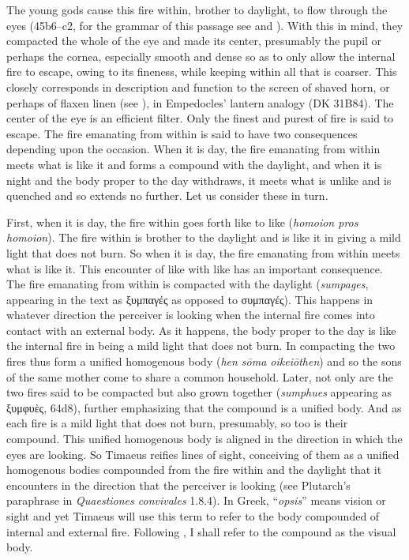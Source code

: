 The young gods cause this fire within, brother to daylight, to flow through the eyes (45b6--c2, for the grammar of this passage see \citealt[63 123--127]{Cook-Wilson:1889cs} and \citealt[277]{Taylor:1928qb}). With this in mind, they compacted the whole of the eye and made its center, presumably the pupil or perhaps the cornea, especially smooth and dense so as to only allow the internal fire to escape, owing to its fineness, while keeping within all that is coarser. This closely corresponds in description and function to the screen of shaved horn, or perhaps of flaxen linen (see \citealt[240--1]{Wright:1981zr}), in Empedocles' lantern analogy (DK 31B84). The center of the eye is an efficient filter. Only the finest and purest of fire is said to escape. The fire emanating from within is said to have two consequences depending upon the occasion. When it is day, the fire emanating from within meets what is like it and forms a compound with the daylight, and when it is night and the body proper to the day withdraws, it meets what is unlike and is quenched and so extends no further. Let us consider these in turn.

First, when it is day, the fire within goes forth like to like (\emph{homoion pros homoion}). The fire within is brother to the daylight and is like it in giving a mild light that does not burn. So when it is day, the fire emanating from within meets what is like it. This encounter of like with like has an important consequence. The fire emanating from within is compacted with the daylight (\emph{sumpages}, appearing in the text as {\sbl ξυμπαγές} as opposed to {\sbl συμπαγές}). This happens in whatever direction the perceiver is looking when the internal fire comes into contact with an external body. As it happens, the body proper to the day is like the internal fire in being a mild light that does not burn. In compacting the two fires thus form a unified homogenous body (\emph{hen sōma oikeiōthen}) and so the sons of the same mother come to share a common household. Later, not only are the two fires said to be compacted but also grown together (\emph{sumphues} appearing as {\sbl ξυμφυὲς}, 64d8), further emphasizing that the compound is a unified body. And as each fire is a mild light that does not burn, presumably, so too is their compound. This unified homogenous body is aligned in the direction in which the eyes are looking. So Timaeus reifies lines of sight, conceiving of them as a unified homogenous bodies compounded from the fire within and the daylight that it encounters in the direction that the perceiver is looking (see Plutarch's paraphrase in \emph{Quaestiones convivales} 1.8.4). In Greek, ``\emph{opsis}'' means vision or sight and yet Timaeus will use this term to refer to the body compounded of internal and external fire. Following \citet[221]{Ierodiakonou:2005ly}, I shall refer to the compound as the visual body.

